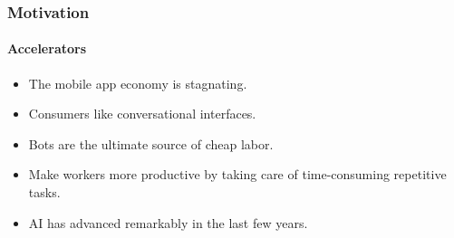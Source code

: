\documentclass[11pt]{beamer}
\begin{document}
\begin{frame}
	\frametitle{Motivation}
	\framesubtitle{Accelerators}
	\begin{itemize}
		\item The mobile app economy is stagnating.
		\item Consumers like conversational interfaces.
		\item Bots are the ultimate source of cheap labor.
		\item Make workers more productive by taking care of time-consuming repetitive tasks.
		\item AI has advanced remarkably in the last few years.
	\end{itemize}
\end{frame}
\end{document}
